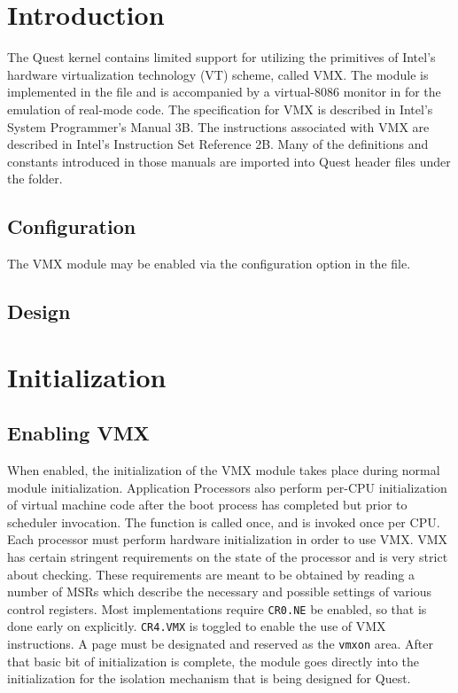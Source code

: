 \documentclass[twocolumn]{article}
\newcommand\func[1]{{\path {#1}}}
\newcommand\optn[1]{{\path {#1}}}
\newcommand\bit[2]{{\tt {#1}.{#2}}}
\newcommand\inst[1]{{\tt {#1}}}
\begin{document}
\section{Introduction}
The Quest kernel contains limited support for utilizing the primitives
of Intel's hardware virtualization technology (VT) scheme, called VMX.
The module is implemented in the  file and is
accompanied by a virtual-8086 monitor in  for the
emulation of real-mode code.  The specification for VMX is described
in Intel's System Programmer's Manual 3B.  The instructions associated
with VMX are described in Intel's Instruction Set Reference 2B.  Many
of the definitions and constants introduced in those manuals are
imported into Quest header files under the  folder.

\subsection{Configuration}
The VMX module may be enabled via the configuration option
\optn{USE_VMX} in the  file.

\subsection{Design}

\section{Initialization}
\subsection{Enabling VMX}
When enabled, the initialization of the VMX module takes place during
normal module initialization.  Application Processors also perform
per-CPU initialization of virtual machine code after the boot process
has completed but prior to scheduler invocation.  The function
\func{vmx_global_init} is called once, and \func{vmx_processor_init}
is invoked once per CPU.  Each processor must perform hardware
initialization in order to use VMX. VMX has certain stringent
requirements on the state of the processor and is very strict about
checking.  These requirements are meant to be obtained by reading a
number of MSRs which describe the necessary and possible settings of
various control registers.  Most implementations require \bit{CR0}{NE}
be enabled, so that is done early on explicitly.  \bit{CR4}{VMX} is
toggled to enable the use of VMX instructions.  A page must be
designated and reserved as the \inst{vmxon} area.  After that basic
bit of initialization is complete, the module goes directly into the
initialization for the isolation mechanism that is being designed for
Quest.
\end{document}
